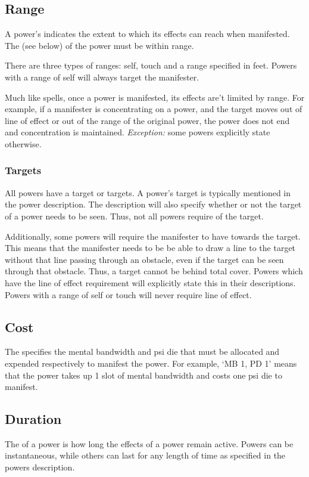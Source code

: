 \subsection{Range}
A power's  indicates the extent
to which its effects can reach when manifested.
The  (see below) of the power must be within range.

There are three types of ranges: self, touch and a range
specified in feet.
Powers with a range of self will always target the manifester.

Much like spells,
once a power is manifested,
its effects are't limited by range.
For example,
if a manifester is concentrating on a power,
and the target moves out of line of effect or out of
the range of the original power,
the power does not end and concentration is maintained.
\textit{Exception:} some powers explicitly state otherwise.

\subsubsection{Targets}
\label{subs:targets}
All powers have a target or targets.
A power's target is typically mentioned in the power description.
The description will also specify whether or not the target
of a power needs to be seen.
Thus, not all powers require  of the target.

Additionally, some powers will
require the manifester to have 
towards the target.
This means that the manifester needs to be be able to draw a line
to the target without that line passing through an obstacle,
even if the target can be seen through that obstacle.
Thus, a target cannot be behind total cover.
Powers which have the line of effect requirement
will explicitly state this in their descriptions.
Powers with a range of self or touch
will never require line of effect.

\subsection{Cost}
The  specifies the mental bandwidth and psi die
that must be allocated and expended respectively to manifest the power.
For example,
`MB 1, PD 1'
means that the power takes up 1 slot of mental bandwidth
and costs one psi die to manifest.

\subsection{Duration}
The  of a power is how long the effects
of a power remain active.
Powers can be instantaneous,
while others can last for any length of time
as specified in the powers description.

